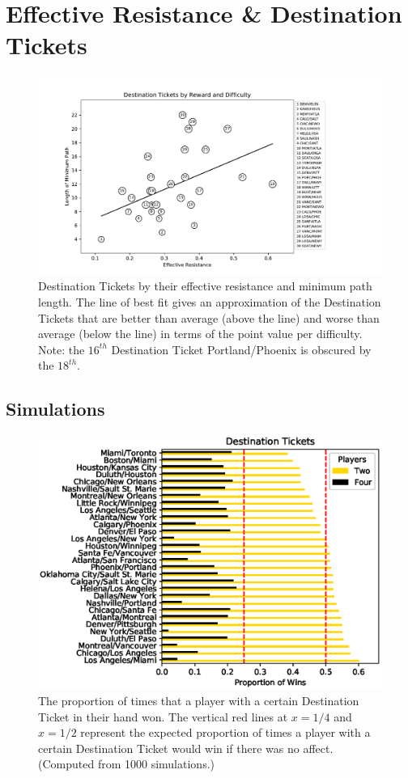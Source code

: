 \section{Effective Resistance \& Destination Tickets}

\begin{figure}[!ht]
\centering
\includegraphics[scale=.8]{figures/resistance}
\caption{Destination Tickets by their effective
resistance and minimum path length.
The line of best fit gives an approximation of the
Destination Tickets that are better than average (above the line)
and worse than average (below the line) in terms
of the point value per difficulty.
Note: the $16^{th}$ Destination Ticket Portland/Phoenix is obscured
by the $18^{th}$.}
\label{fig:resistance}
\end{figure}

\subsection{Simulations}

\begin{figure}[!ht]
\centering
\includegraphics[scale=.8]{figures/destination_tickets}
\caption{The proportion of times that a player with a certain
Destination Ticket in their hand won.
The vertical red lines at $x=1/4$ and $x=1/2$ represent
the expected proportion of times a player with a certain Destination Ticket
would win if there was no affect. (Computed from 1000 simulations.)}
\label{fig:tickets}
\end{figure}


